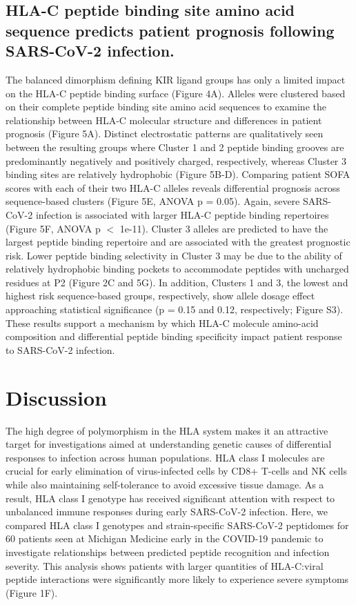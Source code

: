 \documentclass[utf8]{frontiersinFPHY_FAMS} %
\begin{document}
\subsection*{HLA-C peptide binding site amino acid sequence predicts patient prognosis following SARS-CoV-2 infection.} The balanced dimorphism defining KIR ligand groups has only a limited impact on the HLA-C peptide binding surface (Figure 4A). Alleles were clustered based on their complete peptide binding site amino acid sequences to examine the relationship between HLA-C molecular structure and differences in patient prognosis (Figure 5A). Distinct electrostatic patterns are qualitatively seen between the resulting groups where Cluster 1 and 2 peptide binding grooves are predominantly negatively and positively charged, respectively, whereas Cluster 3 binding sites are relatively hydrophobic (Figure 5B-D). Comparing patient SOFA scores with each of their two HLA-C alleles reveals differential prognosis across sequence-based clusters (Figure 5E, ANOVA p = 0.05). Again, severe SARS-CoV-2 infection is associated with larger HLA-C peptide binding repertoires (Figure 5F, ANOVA p $<$ 1e-11). Cluster 3 alleles are predicted to have the largest peptide binding repertoire and are associated with the greatest prognostic risk. Lower peptide binding selectivity in Cluster 3 may be due to the ability of relatively hydrophobic binding pockets to accommodate peptides with uncharged residues at P2 (Figure 2C and 5G). In addition, Clusters 1 and 3, the lowest and highest risk sequence-based groups, respectively, show allele dosage effect approaching statistical significance (p = 0.15 and 0.12, respectively; Figure S3). These results support a mechanism by which HLA-C molecule amino-acid composition and differential peptide binding specificity impact patient response to SARS-CoV-2 infection.

\section*{Discussion}

The high degree of polymorphism in the HLA system makes it an attractive target for investigations aimed at understanding genetic causes of differential responses to infection across human populations. HLA class I molecules are crucial for early elimination of virus-infected cells by CD8+ T-cells and NK cells while also maintaining self-tolerance to avoid excessive tissue damage. As a result, HLA class I genotype has received significant attention with respect to unbalanced immune responses during early SARS-CoV-2 infection. Here, we compared HLA class I genotypes and strain-specific SARS-CoV-2 peptidomes for 60 patients seen at Michigan Medicine early in the COVID-19 pandemic to investigate relationships between predicted peptide recognition and infection severity. This analysis shows patients with larger quantities of HLA-C:viral peptide interactions were significantly more likely to experience severe symptoms (Figure 1F). 
\end{document}
